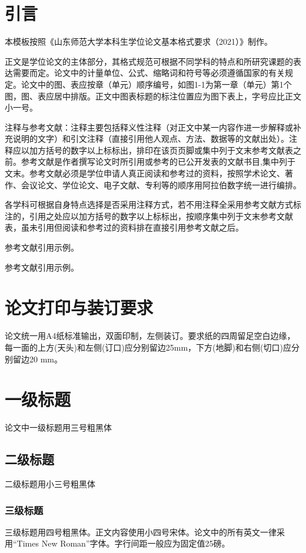 \section{引言}
	本模板按照《山东师范大学本科生学位论文基本格式要求（2021）》制作。
	
	正文是学位论文的主体部分，其格式规范可根据不同学科的特点和所研究课题的表达需要而定。论文中的计量单位、公式、缩略词和符号等必须遵循国家的有关规定。论文中的图、表应按章（单元）顺序编号，如图1-1为第一章（单元）第1个图，图、表应居中排版。正文中图表标题的标注位置应为图下表上，字号应比正文小一号。
	
	注释与参考文献：注释主要包括释义性注释（对正文中某一内容作进一步解释或补充说明的文字）和引文注释（直接引用他人观点、方法、数据等的文献出处）。注释应以加方括号的数字以上标标出，排印在该页页脚或集中列于文末参考文献表之前。参考文献是作者撰写论文时所引用或参考的已公开发表的文献书目,集中列于文末。参考文献必须是学位申请人真正阅读和参考过的资料，按照学术论文、著作、会议论文、学位论文、电子文献、专利等的顺序用阿拉伯数字统一进行编排。
	
	各学科可根据自身特点选择是否采用注释方式，若不用注释全采用参考文献方式标注的，引用之处应以加方括号的数字以上标标出，按顺序集中列于文末参考文献表，虽未引用但阅读和参考过的资料排在直接引用参考文献之后。
	
	参考文献引用示例。
	
	参考文献引用示例\cite{1, somename}。
	
\section{论文打印与装订要求}

	论文统一用A4纸标准输出，双面印制，左侧装订。要求纸的四周留足空白边缘，每一面的上方(天头)和左侧(订口)应分别留边25mm，下方(地脚)和右侧(切口)应分别留边20 mm。

\section{一级标题}
	论文中一级标题用三号粗黑体
\subsection{二级标题}
	二级标题用小三号粗黑体
\subsubsection{三级标题}
	三级标题用四号粗黑体。正文内容使用小四号宋体。论文中的所有英文一律采用“Times New Roman”字体。字行间距一般应为固定值25磅。

